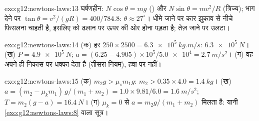 \begin{solution}{exo:g12:newtons-laws:13}
घर्षणहीन: $N\cos\theta = mg$ () और $N\sin\theta =
mv^2/R$ (त्रिज्य); भाग देने पर $\tan\theta = v^2/(gR) = 400/784.8$: $\theta \approx 27^\circ$।
धीमे जाने पर कार झुकाव से नीचे फिसलना चाहती है, इसलिए  को ढलान
पर ऊपर की ओर होना पड़ता है; तेज़ जाने पर उलटा।
\end{solution}

\begin{solution}{exo:g12:newtons-laws:14}
(क) हर  $250 \times 2500 = \qty{6.3e5}{kg.m/s}$:  $\qty{6.3e5}{N}$। (ख) $P = \qty{4.9e5}{N}$; $a = (6.25 - 4.905) \times 10^5 / \num{5.0e4} = \qty{2.7}{m/s^2}$। (ग) वह अपने ही
निकास पर धक्का देता है (तीसरा नियम), हवा पर नहीं।
\end{solution}

\begin{solution}{exo:g12:newtons-laws:15}
(क) $m_2 g > \mu_s m_1 g$: $m_2 > 0.35 \times 4.0 = \qty{1.4}{kg}$। (ख) $a = (m_2 - \mu_k m_1)\,g/(m_1 + m_2) = 1.0 \times 9.81/6.0 =
\qty{1.6}{m/s^2}$; $T = m_2(g - a) = \qty{16.4}{N}$। (ग) $\mu_k = 0$ से $a = m_2 g/(m_1 + m_2)$ मिलता है: यानी
\cref{exo:g12:newtons-laws:8} वाला सूत्र।
\end{solution}

